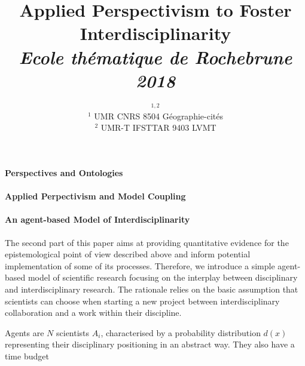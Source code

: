 


\title{Applied Perspectivism to Foster Interdisciplinarity\\\medskip
\textit{Ecole thématique de Rochebrune 2018}
}
\author{$^{1,2}$\\
$^{1}$ UMR CNRS 8504 Géographie-cités\\
$^{2}$ UMR-T IFSTTAR 9403 LVMT
}
\date{}


\maketitle

\justify

\begin{abstract}
	
\end{abstract}




\paragraph{Perspectives and Ontologies}




\paragraph{Applied Perpectivism and Model Coupling}



\paragraph{An agent-based Model of Interdisciplinarity}

The second part of this paper aims at providing quantitative evidence for the epistemological point of view described above and inform potential implementation of some of its processes. Therefore, we introduce a simple agent-based model of scientific research focusing on the interplay between disciplinary and interdisciplinary research. The rationale relies on the basic assumption that scientists can choose when starting a new project between interdisciplinary collaboration and a work within their discipline.

Agents are $N$ scientists $A_i$, characterised by a probability distribution $d(x)$ representing their disciplinary positioning in an abstract way. They also have a time budget 




\footnotesize






